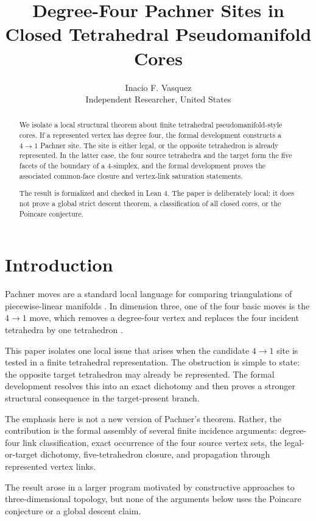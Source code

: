 \documentclass[11pt]{article}
\title{Degree-Four Pachner Sites in Closed Tetrahedral Pseudomanifold Cores}
\author{Inacio F. Vasquez\\Independent Researcher, United States}
\date{}
\theoremstyle{definition}
\theoremstyle{remark}
\begin{document}
\maketitle

\begin{abstract}
We isolate a local structural theorem about finite tetrahedral
pseudomanifold-style cores.  If a represented vertex has degree four, the
formal development constructs a $4\to1$ Pachner site.  The site is either
legal, or the opposite tetrahedron is already represented.  In the latter
case, the four source tetrahedra and the target form the five facets of the
boundary of a $4$-simplex, and the formal development proves the associated
common-face closure and vertex-link saturation statements.

The result is formalized and checked in Lean 4.  The paper is deliberately local:
it does not prove a global strict descent theorem, a classification of all
closed cores, or the Poincare conjecture.
\end{abstract}

\section{Introduction}

Pachner moves are a standard local language for comparing triangulations of
piecewise-linear manifolds \cite{Pachner1991,Lickorish1999}.  In dimension
three, one of the four basic moves is the $4\to1$ move, which removes a
degree-four vertex and replaces the four incident tetrahedra by one
tetrahedron \cite{Burton2013,Regina2004}.

This paper isolates one local issue that arises when the candidate
$4\to1$ site is tested in a finite tetrahedral representation.  The
obstruction is simple to state: the opposite target tetrahedron may already
be represented.  The formal development resolves this into an exact
dichotomy and then proves a stronger structural consequence in the
target-present branch.

The emphasis here is not a new version of Pachner's theorem.  Rather, the
contribution is the formal assembly of several finite incidence arguments:
degree-four link classification, exact occurrence of the four source vertex
sets, the legal-or-target dichotomy, five-tetrahedron closure, and
propagation through represented vertex links.

The result arose in a larger program motivated by constructive approaches to
three-dimensional topology, but none of the arguments below uses the
Poincare conjecture or a global descent claim.
\end{document}
